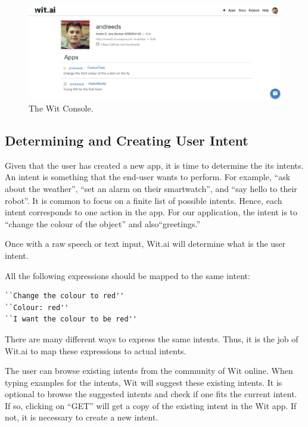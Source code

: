 \documentclass[twoside,11pt]{article}
\begin{document}
\begin{figure}
\label{fig:console}
\centerline{
\includegraphics[width=\textwidth]{figures/Wit_Console.png}
}
\caption{The Wit Console.}
\end{figure}

\subsection{Determining and Creating User Intent}

Given that the user has created a new app, it is time to determine the its intents.
An intent is something that the end-user wants to perform.
For example,
``ask about the weather'', 
``set an alarm on their smartwatch'', and 
``say hello to their robot''.
It is common to focus on a finite list of possible intents.
Hence, each intent corresponds to one action in the app.
For our application, the intent is to ``change the colour of the object'' and also``greetings.''

Once with a raw speech or text input, Wit.ai will determine what is the user intent.

\begin{example}
\label{exe:intent}
All the following expressions should be mapped to the same intent:
\begin{lstlisting}[language=html]
``Change the colour to red''
``Colour: red''
``I want the colour to be red''
\end{lstlisting}
\end{example}

There are many different ways to express the same intents. 
Thus, it is the job of Wit.ai to map these expressions to actual intents.

The user can browse existing intents from the community of Wit online.
When typing examples for the intents, Wit will suggest these existing intents. 
It is optional to browse the suggested intents and check  if one fits the current intent. 
If so, clicking on “GET” will get a copy of the existing intent in the Wit app.
If not, it is necessary to create a new intent.
\end{document}
